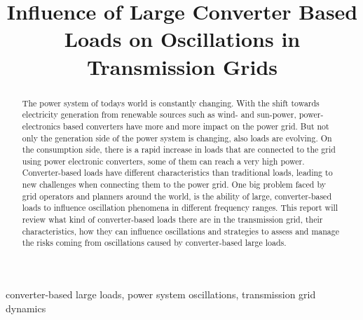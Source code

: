 \documentclass[conference]{IEEEtran}
\begin{document}
\title{Influence of Large Converter Based Loads on Oscillations in Transmission Grids\\}



\author{
}

\maketitle

\begin{abstract}
The power system of todays world is constantly changing. With the shift towards electricity generation from renewable sources such as wind- and sun-power, power-electronics based converters have more and more impact on the power grid. But not only the generation side of the power system is changing, also loads are evolving. On the consumption side, there is a rapid increase in loads that are connected to the grid using power electronic converters, some of them can reach a very high power. Converter-based loads have different characteristics than traditional loads, leading to new challenges when connecting them to the power grid. One big problem faced by grid operators and planners around the world, is the ability of large, converter-based loads to influence oscillation phenomena in different frequency ranges. This report will review what kind of converter-based loads there are in the transmission grid, their characteristics, how they can influence oscillations and strategies to assess and manage the risks coming from oscillations caused by converter-based large loads. \end{abstract}

\begin{IEEEkeywords}
converter-based large loads, power system oscillations, transmission grid dynamics
\end{IEEEkeywords}
\end{document}
